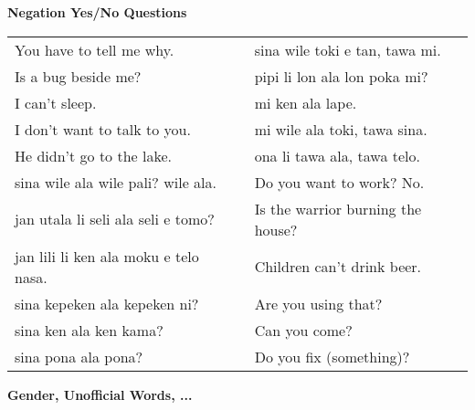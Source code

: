 \textbf{Negation Yes/No Questions} 
\label{'negation_yes_no_questions'}

\begin{supertabular}{p{5,5cm}|ll}
You have to tell me why.  && sina wile toki e tan, tawa mi. \\ %
Is a bug beside me?  && pipi li lon ala lon poka mi? \\ %
I can't sleep.  && mi ken ala lape. \\ %
I don't want to talk to you.  && mi wile ala toki, tawa sina. \\ %
He didn't go to the lake.  && ona li tawa ala, tawa telo. \\ %
sina wile ala wile pali? wile ala.  && Do you want to work? No. \\
jan utala li seli ala seli e tomo?  && Is the warrior burning the house? \\
jan lili li ken ala moku e telo nasa.  && Children can't drink beer. \\
sina kepeken ala kepeken ni?  && Are you using that? \\
sina ken ala ken kama?  && Can you come? \\
sina pona ala pona? && Do you fix (something)? \\
\end{supertabular} 

\textbf{Gender, Unofficial Words, ...} 
\label{'gender_unofficial_words_etc'}

